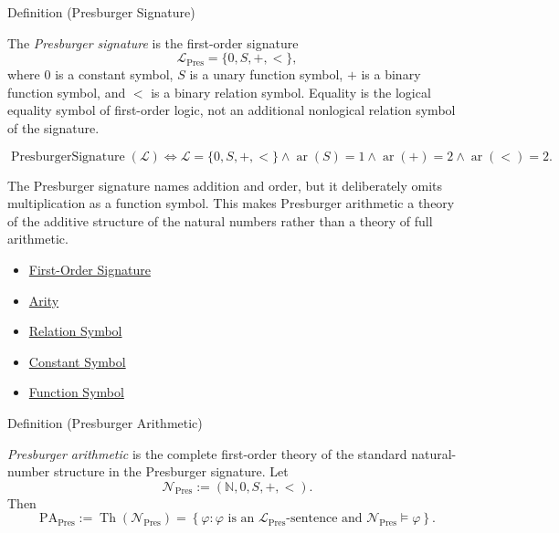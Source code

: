 \begin{definitionbox}{Definition (Presburger Signature)}
\begin{definition}
\label{def:presburger-signature}
The \emph{Presburger signature} is the first-order signature
\[
\mathcal{L}_{\mathrm{Pres}} = \{0, S, +, <\},
\]
where $0$ is a constant symbol, $S$ is a unary function symbol, $+$ is a
binary function symbol, and $<$ is a binary relation symbol. Equality is the
logical equality symbol of first-order logic, not an additional nonlogical
relation symbol of the signature.
\end{definition}
\end{definitionbox}

\begin{remark*}
\[
\operatorname{PresburgerSignature}(\mathcal{L})
\Longleftrightarrow
\mathcal{L} = \{0,S,+,<\}
\land \operatorname{ar}(S)=1
\land \operatorname{ar}(+)=2
\land \operatorname{ar}(<)=2.
\]
\end{remark*}

\begin{remark*}[Interpretation]
The Presburger signature names addition and order, but it deliberately omits
multiplication as a function symbol. This makes Presburger arithmetic a theory
of the additive structure of the natural numbers rather than a theory of full
arithmetic.
\end{remark*}

\begin{dependencies}
\begin{itemize}
  \item \hyperref[def:signature]{First-Order Signature}
  \item \hyperref[def:arity]{Arity}
  \item \hyperref[def:relation-symbol]{Relation Symbol}
  \item \hyperref[def:signature-constant-symbol]{Constant Symbol}
  \item \hyperref[def:signature-function-symbol]{Function Symbol}
\end{itemize}
\end{dependencies}

\begin{definitionbox}{Definition (Presburger Arithmetic)}
\begin{definition}
\label{def:presburger-arithmetic}
\emph{Presburger arithmetic} is the complete first-order theory of the
standard natural-number structure in the Presburger signature. Let
\[
\mathcal N_{\mathrm{Pres}}
:=
(\mathbb{N},0,S,+,<).
\]
Then
\[
\mathrm{PA}_{\mathrm{Pres}}
:=
\operatorname{Th}(\mathcal N_{\mathrm{Pres}})
=
\left\{
\varphi:
\varphi \text{ is an }\mathcal L_{\mathrm{Pres}}\text{-sentence and }
\mathcal N_{\mathrm{Pres}}\models\varphi
\right\}.
\]
\end{definition}
\end{definitionbox}

